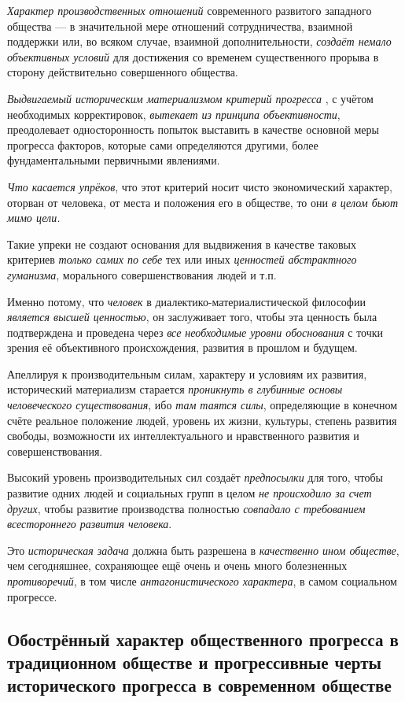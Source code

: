 \documentclass[a4paper,14pt,russian]{extreport}
\begin{document}
\emph{Характер производственных отношений} современного развитого западного общества --- в значительной мере отношений сотрудничества, взаимной поддержки или, во всяком случае, взаимной дополнительности, \emph{создаёт немало объективных условий} для достижения со временем существенного прорыва в сторону действительно совершенного общества.

\emph{Выдвигаемый историческим материализмом критерий прогресса} , с учётом необходимых корректировок, \emph{вытекает из принципа объективности}, преодолевает односторонность попыток выставить в качестве основной меры прогресса факторов, которые сами определяются другими, более фундаментальными первичными явлениями.

\emph{Что касается упрёков}, что этот критерий носит чисто экономический характер, оторван от человека, от места и положения его в обществе, то они \emph{в целом бьют мимо цели.}

Такие упреки не создают основания для выдвижения в качестве таковых критериев \emph{только самих по себе} тех или иных \emph{ценностей абстрактного гуманизма}, морального совершенствования людей и т.п.

Именно потому, что \emph{человек} в диалектико-материалистической философии \emph{является высшей ценностью}, он заслуживает того, чтобы эта ценность была подтверждена и проведена через \emph{все необходимые уровни обоснования} с точки зрения её объективного происхождения, развития в прошлом и будущем.

Апеллируя к производительным силам, характеру и условиям их развития, исторический материализм старается \emph{проникнуть в глубинные основы человеческого существования}, ибо \emph{там таятся силы}, определяющие в конечном счёте реальное положение людей, уровень их жизни, культуры, степень развития свободы, возможности их интеллектуального и нравственного развития и совершенствования.

Высокий уровень производительных сил создаёт \emph{предпосылки} для того, чтобы развитие одних людей и социальных групп в целом \emph{не происходило за счет других}, чтобы развитие производства полностью \emph{совпадало с требованием всестороннего развития человека}.

Это \emph{историческая задача} должна быть разрешена в \emph{качественно ином обществе}, чем сегодняшнее, сохраняющее ещё очень и очень много болезненных \emph{противоречий}, в том числе \emph{антагонистического характера}, в самом социальном прогрессе.

\subsection{Обострённый характер общественного прогресса в традиционном обществе и прогрессивные черты исторического прогресса в современном обществе}
\end{document}
